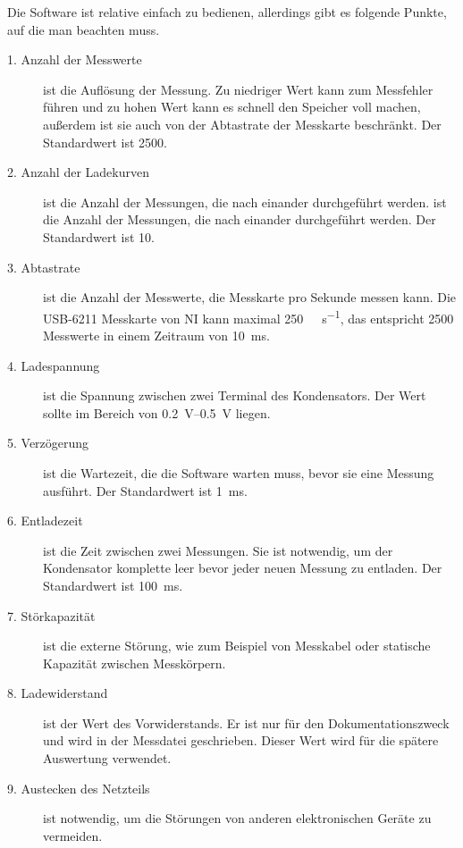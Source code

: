 Die Software ist relative einfach zu bedienen, allerdings gibt es folgende Punkte, auf die man beachten muss.
\begin{description}
    \item[1. Anzahl der Messwerte] ist die Auflösung der Messung.
        Zu niedriger Wert kann zum Messfehler führen und zu hohen Wert kann es schnell den Speicher voll machen, außerdem ist sie auch von der Abtastrate der Messkarte beschränkt.
        Der Standardwert ist \num{2500}.

    \item[2. Anzahl der Ladekurven] ist die Anzahl der Messungen, die nach einander durchgeführt werden. ist die Anzahl der Messungen, die nach einander durchgeführt werden.
        Der Standardwert ist \num{10}.

    \item[3. Abtastrate] ist die Anzahl der Messwerte, die Messkarte pro Sekunde messen kann.
        Die USB-6211 Messkarte von NI kann maximal \SI[per-mode=symbol]{250}{\kilo\sample\per\second}, das entspricht \num{2500} Messwerte in einem Zeitraum von \SI{10}{\milli\second}.

    \item[4. Ladespannung] ist die Spannung zwischen zwei Terminal des Kondensators.
        Der Wert sollte im Bereich von \SIrange{0.2}{0.5}{\volt} liegen.

    \item[5. Verzögerung] ist die Wartezeit, die die Software warten muss, bevor sie eine Messung ausführt.
        Der Standardwert ist \SI{1}{\ms}.

    \item[6. Entladezeit] ist die Zeit zwischen zwei Messungen.
        Sie ist notwendig, um der Kondensator komplette leer bevor jeder neuen Messung zu entladen.
        Der Standardwert ist \SI{100}{\ms}.

    \item[7. Störkapazität] ist die externe Störung, wie zum Beispiel von Messkabel oder statische Kapazität zwischen Messkörpern.

    \item[8. Ladewiderstand] ist der Wert des Vorwiderstands.
        Er ist nur für den Dokumentationszweck und wird in der Messdatei geschrieben.
        Dieser Wert wird für die spätere Auswertung verwendet.

    \item[9. Austecken des Netzteils] ist notwendig, um die Störungen von anderen elektronischen Geräte zu vermeiden.
\end{description}

